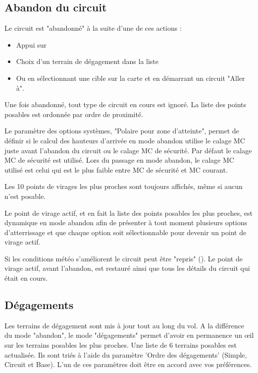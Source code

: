 \subsection*{Abandon du circuit}\label{sec:taskabort}
Le circuit est "abandonné" à la suite d'une de ces actions :
\begin{itemize}
\item Appui sur  \blink{}
\item Choix d'un terrain de dégagement dans la liste  
 \blink{}
\item Ou en sélectionnant une cible sur la carte et en démarrant un circuit "Aller à".
\end{itemize}

Une fois abandonné, tout type de circuit en cours est ignoré. La liste des points posables est ordonnée par ordre de proximité.

Le paramètre des options systèmes, "Polaire pour zone d'atteinte", permet de définir si le calcul des hauteurs d'arrivée en mode abandon utilise le calage MC juste avant l'abandon du circuit ou le calage MC de sécurité.  Par défaut le calage MC de sécurité est utilisé. Lors du passage en mode abandon, le calage MC utilisé est celui qui est le plus faible entre MC de sécurité et MC courant.

Les 10 points de virages les plus proches sont toujours affichés, même si aucun n'est posable.

Le point de virage actif, et en fait la liste des points posables les plus proches, est dynamique en mode abandon afin de présenter à tout moment plusieurs options d'atterrissage et que chaque option soit sélectionnable pour devenir un point de virage actif.

Si les conditions météo s'améliorent le circuit peut être "repris" (\blink{}). Le point de virage actif, avant l'abandon, est restauré ainsi que tous les détails du circuit qui était en cours.

\subsection*{Dégagements} \label{sec:alternates}
Les terrains de dégagement sont mis à jour tout au long du vol. A la différence du mode "abandon", le mode "dégagements" permet d'avoir en permanence un œil sur les terrains posables les plus proches. Une liste de 6 terrains posables est actualisée. Ils sont triés à l'aide du paramètre 'Ordre des dégagements' (Simple, Circuit et Base).  L'un de ces paramètres doit être en accord avec vos préférences.

